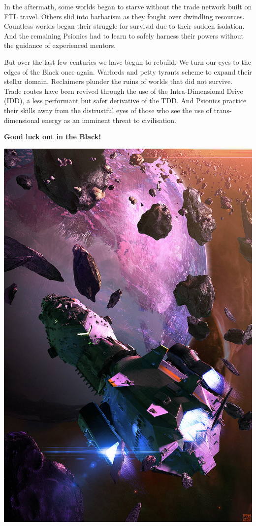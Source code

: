 \documentclass[10pt,twoside]{article}
\begin{document}
\begin{multicols}{2}
  In the aftermath, some worlds began to starve without the trade network built on FTL travel. Others slid into barbarism as they fought over dwindling resources. Countless worlds began their struggle for survival due to their sudden isolation. And the remaining Psionics had to learn to safely harness their powers without the guidance of experienced mentors.

  But over the last few centuries we have begun to rebuild. We turn our eyes to the edges of the Black once again. Warlords and petty tyrants scheme to expand their stellar domain. Reclaimers plunder the ruins of worlds that did not survive. Trade routes have been revived through the use of the Intra-Dimensional Drive (IDD), a less performant but safer derivative of the TDD. And Psionics practice their skills away from the distrustful eyes of those who see the use of trans-dimensional energy as an imminent threat to civilisation.

  \textbf{Good luck out in the Black!}
  
  \vspace{\baselineskip}
  
  \includegraphics[width=\linewidth]{rebellion_of_stars___starship_blackbeard_by_hideyoshi-d8p607x}
  

\end{multicols}
\end{document}
